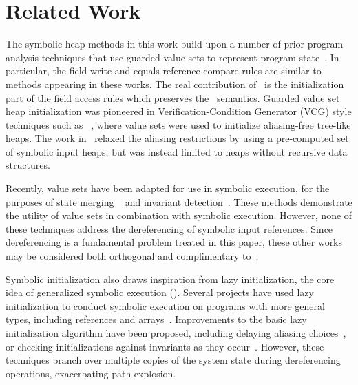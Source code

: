 \section{Related Work}
\label{sec:related}
%
The symbolic heap methods in this work build upon a
number of prior program analysis techniques that use guarded value sets to
represent program
state~\cite{Sen:2014,Torlak:2014,Xie:2005,Dillig:2011,Elkarablieh:2009}. In particular, the field write and equals reference compare rules are similar to methods appearing in these works. The real contribution of \symtxt\ is the initialization part of the field access rules which preserves the \gsetxt\ semantics.
Guarded value set heap initialization was pioneered in Verification-Condition Generator (VCG) style techniques such as ~\cite{Xie:2005}, where value sets were used to 
initialize aliasing-free tree-like heaps. The work in~\cite{Dillig:2011} relaxed the aliasing restrictions by using a pre-computed set of symbolic input heaps, but was instead limited to heaps without recursive data structures. 

Recently, value sets have been adapted for use in symbolic execution, for the purposes of state merging ~\cite{Sen:2014,Torlak:2014} and invariant detection~\cite{Ferrara:2014}. These methods demonstrate the utility of value sets in combination with symbolic execution. However, none of these techniques address the dereferencing of symbolic input references. Since dereferencing is a fundamental problem treated in this paper, these other works may be considered both orthogonal and complimentary to~\symtxt{}.

Symbolic initialization also draws inspiration from lazy initialization, the core idea of generalized symbolic execution (\gsetxt{})\cite{GSE03}. Several projects have used lazy initialization to conduct symbolic execution on programs with more general types,
including references and
arrays~\cite{KiasanKunit,Cadar:2008,Blackshear:2013,Filieri:2015}. Improvements to the basic lazy initialization algorithm have been proposed, including delaying aliasing choices~\cite{Deng:2007}, or checking initializations against invariants as they occur~\cite{Braione:2015,Rosner:2015}. However, these \gsetxt{} techniques branch over
multiple copies of the system state during dereferencing operations,
exacerbating path explosion.

